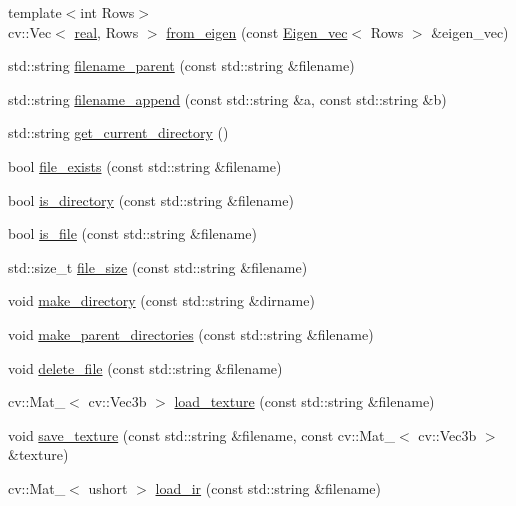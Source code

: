 \begin{DoxyCompactItemize}
\item 
{\footnotesize template$<$int Rows$>$ }\\cv\+::\+Vec$<$ \hyperlink{namespacetlz_a15fd37cce97f2b8b606af18c2615f602}{real}, Rows $>$ \hyperlink{namespacetlz_acd150013511be65f596e45a980758a08}{from\+\_\+eigen} (const \hyperlink{namespacetlz_a2956723eeab1e0b07f733e404d96e20e}{Eigen\+\_\+vec}$<$ Rows $>$ \&eigen\+\_\+vec)
\item 
std\+::string \hyperlink{namespacetlz_a53fd8432b1fb4951c1063459e3d4192a}{filename\+\_\+parent} (const std\+::string \&filename)
\item 
std\+::string \hyperlink{namespacetlz_a900203d2262fb0fc765dc70a2ac06a10}{filename\+\_\+append} (const std\+::string \&a, const std\+::string \&b)
\item 
std\+::string \hyperlink{namespacetlz_a789aecfb1068d38c71d4391bddac05f3}{get\+\_\+current\+\_\+directory} ()
\item 
bool \hyperlink{namespacetlz_abb019466ea9f56c0dab27e893d891837}{file\+\_\+exists} (const std\+::string \&filename)
\item 
bool \hyperlink{namespacetlz_aa0455356ea4da01905c0244916713096}{is\+\_\+directory} (const std\+::string \&filename)
\item 
bool \hyperlink{namespacetlz_ae17e27772000e400fbab51d26aea4130}{is\+\_\+file} (const std\+::string \&filename)
\item 
std\+::size\+\_\+t \hyperlink{namespacetlz_ac3f712af6b4130b82c4f3a1638313369}{file\+\_\+size} (const std\+::string \&filename)
\item 
void \hyperlink{namespacetlz_aa1c32c6f56cb0eb8af7699dc89b92e4f}{make\+\_\+directory} (const std\+::string \&dirname)
\item 
void \hyperlink{namespacetlz_aa5b709c2c55ca5cbb99d14a1c5973156}{make\+\_\+parent\+\_\+directories} (const std\+::string \&filename)
\item 
void \hyperlink{namespacetlz_a0a437a605a9c75fdcc6a05e87d6a97f3}{delete\+\_\+file} (const std\+::string \&filename)
\item 
cv\+::\+Mat\+\_\+$<$ cv\+::\+Vec3b $>$ \hyperlink{namespacetlz_afbf92393383d3dde6ffd98700ea014f1}{load\+\_\+texture} (const std\+::string \&filename)
\item 
void \hyperlink{namespacetlz_abef378599dee0140819b796094d46e0f}{save\+\_\+texture} (const std\+::string \&filename, const cv\+::\+Mat\+\_\+$<$ cv\+::\+Vec3b $>$ \&texture)
\item 
cv\+::\+Mat\+\_\+$<$ ushort $>$ \hyperlink{namespacetlz_a078f1236fdf6729a06ff306ed88c488e}{load\+\_\+ir} (const std\+::string \&filename)

\end{DoxyCompactItemize}
